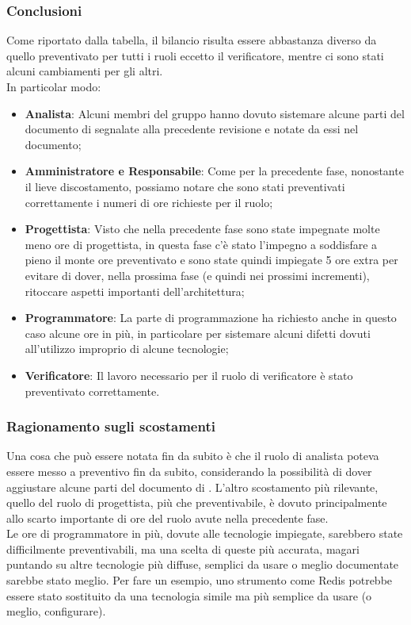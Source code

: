 \subsubsection{Conclusioni}
Come riportato dalla tabella, il bilancio risulta essere abbastanza diverso da quello preventivato per tutti i ruoli eccetto il verificatore, mentre ci sono stati alcuni cambiamenti per gli altri. \\
In particolar modo:
\begin{itemize}
    \item \textbf{Analista}: Alcuni membri del gruppo hanno dovuto sistemare alcune parti del documento di \AdR{} segnalate alla precedente revisione e notate da essi nel documento;
	\item \textbf{Amministratore e Responsabile}: Come per la precedente fase, nonostante il lieve discostamento, possiamo notare che sono stati preventivati correttamente i numeri di ore richieste per il ruolo;
    \item \textbf{Progettista}: Visto che nella precedente fase sono state impegnate molte meno ore di progettista, in questa fase c'è stato l'impegno a soddisfare a pieno il monte ore preventivato e sono state quindi impiegate 5 ore extra per evitare di dover, nella prossima fase (e quindi nei prossimi incrementi), ritoccare aspetti importanti dell'architettura;
    \item \textbf{Programmatore}: La parte di programmazione ha richiesto anche in questo caso alcune ore in più, in particolare per sistemare alcuni difetti dovuti all'utilizzo improprio di alcune tecnologie;
	\item \textbf{Verificatore}: Il lavoro necessario per il ruolo di verificatore è stato preventivato correttamente. 
\end{itemize}
\subsubsection{Ragionamento sugli scostamenti}
Una cosa che può essere notata fin da subito è che il ruolo di analista poteva essere messo a preventivo fin da subito, considerando la possibilità di dover aggiustare alcune parti del documento di \AdR{}. L'altro scostamento più rilevante, quello del ruolo di progettista, più che preventivabile, è dovuto principalmente allo scarto importante di ore del ruolo avute nella precedente fase.\\
Le ore di programmatore in più, dovute alle tecnologie impiegate, sarebbero state difficilmente preventivabili, ma una scelta di queste più accurata, magari puntando su altre tecnologie più diffuse, semplici da usare o meglio documentate sarebbe stato meglio. Per fare un esempio, uno strumento come Redis potrebbe essere stato sostituito da una tecnologia simile ma più semplice da usare (o meglio, configurare).


